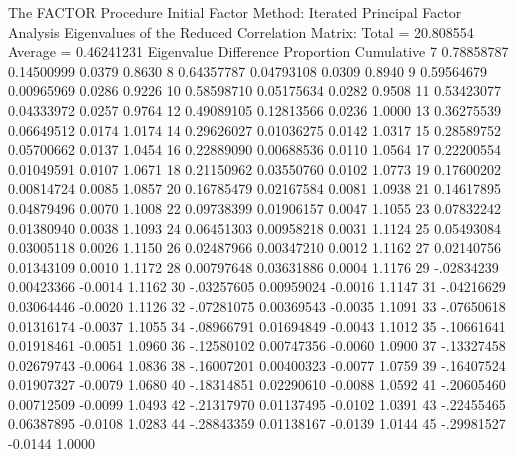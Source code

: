 \documentclass{article}
\begin{document}
\begin{Woutput}
The FACTOR Procedure
Initial Factor Method: Iterated Principal Factor Analysis
Eigenvalues of the Reduced Correlation Matrix: Total = 20.808554  Average = 0.46241231
        Eigenvalue    Difference    Proportion    Cumulative
   7    0.78858787    0.14500999        0.0379        0.8630
   8    0.64357787    0.04793108        0.0309        0.8940
   9    0.59564679    0.00965969        0.0286        0.9226
  10    0.58598710    0.05175634        0.0282        0.9508
  11    0.53423077    0.04333972        0.0257        0.9764
  12    0.49089105    0.12813566        0.0236        1.0000
  13    0.36275539    0.06649512        0.0174        1.0174
  14    0.29626027    0.01036275        0.0142        1.0317
  15    0.28589752    0.05700662        0.0137        1.0454
  16    0.22889090    0.00688536        0.0110        1.0564
  17    0.22200554    0.01049591        0.0107        1.0671
  18    0.21150962    0.03550760        0.0102        1.0773
  19    0.17600202    0.00814724        0.0085        1.0857
  20    0.16785479    0.02167584        0.0081        1.0938
  21    0.14617895    0.04879496        0.0070        1.1008
  22    0.09738399    0.01906157        0.0047        1.1055
  23    0.07832242    0.01380940        0.0038        1.1093
  24    0.06451303    0.00958218        0.0031        1.1124
  25    0.05493084    0.03005118        0.0026        1.1150
  26    0.02487966    0.00347210        0.0012        1.1162
  27    0.02140756    0.01343109        0.0010        1.1172
  28    0.00797648    0.03631886        0.0004        1.1176
  29    -.02834239    0.00423366       -0.0014        1.1162
  30    -.03257605    0.00959024       -0.0016        1.1147
  31    -.04216629    0.03064446       -0.0020        1.1126
  32    -.07281075    0.00369543       -0.0035        1.1091
  33    -.07650618    0.01316174       -0.0037        1.1055
  34    -.08966791    0.01694849       -0.0043        1.1012
  35    -.10661641    0.01918461       -0.0051        1.0960
  36    -.12580102    0.00747356       -0.0060        1.0900
  37    -.13327458    0.02679743       -0.0064        1.0836
  38    -.16007201    0.00400323       -0.0077        1.0759
  39    -.16407524    0.01907327       -0.0079        1.0680
  40    -.18314851    0.02290610       -0.0088        1.0592
  41    -.20605460    0.00712509       -0.0099        1.0493
  42    -.21317970    0.01137495       -0.0102        1.0391
  43    -.22455465    0.06387895       -0.0108        1.0283
  44    -.28843359    0.01138167       -0.0139        1.0144
  45    -.29981527                     -0.0144        1.0000


\end{Woutput}
\end{document}
